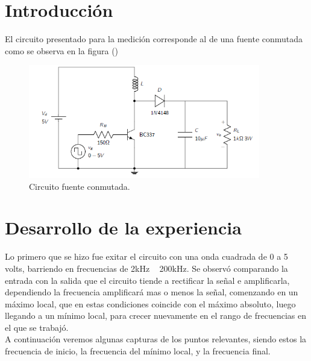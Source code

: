 

\usepackage{float}
\usepackage[caption = false]{subfig}










\section{Introducción}
El circuito presentado para la medición corresponde al de una fuente conmutada como se observa en la figura ()
\begin{figure}[H]
	\centering
	\includegraphics[width=0.9\textwidth]{Imagenes/circ.png}
\caption{Circuito fuente conmutada.}
	\label{fig:fcon}
\end{figure}

\section{Desarrollo de la experiencia}
Lo primero que se hizo fue exitar el circuito con una onda cuadrada de 0 a 5 volts, barriendo en frecuencias de 2kHz ~ 200kHz.
Se observó comparando la entrada con la salida que el circuito tiende a rectificar la señal e amplificarla, dependiendo la frecuencia amplificará mas o menos la señal, comenzando en un máximo local, que en estas condiciones coincide con el máximo absoluto, luego llegando a un mínimo local, para crecer nuevamente en el rango de frecuencias en el que se trabajó.\\
A continuación veremos algunas capturas de los puntos relevantes, siendo estos la frecuencia de inicio, la frecuencia del mínimo local, y la frecuencia final.

